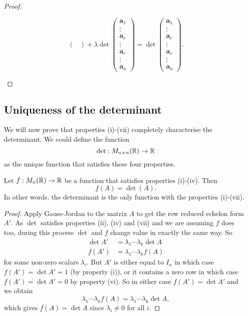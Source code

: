 \documentclass[10pt, a4paper]{article}
\newcommand{\mbf}[1]{\mathbf{#1}}
\begin{document}
\begin{enumerate}[label = (\roman*)]
\begin{proof}
\begin{enumerate}[label = (\roman*)]
\[\begin{pmatrix}
            \end{pmatrix}
            +
            \lambda
            \det\begin{pmatrix}
                \mbf{a}_1 \\ \vdots \\ \mbf{a}_r \\ \vdots \\ \mbf{a}_r \\ \vdots \\ \mbf{a}_n
            \end{pmatrix}
            =
            \det\begin{pmatrix}
                \mbf{a}_1 \\ \vdots \\ \mbf{a}_r \\ \vdots \\ \mbf{a}_s \\ \vdots \\ \mbf{a}_n
            \end{pmatrix}.
            \]
        \end{enumerate}
    \end{proof}
\end{enumerate}

\subsection{Uniqueness of the determinant}
We will now prove that properties (i)-(vii) completely characterise the determinant.
We could define the function
\[
\det : M_{n \times n}(\mathbb{R}) \rightarrow \mathbb{R}
\]
as the unique function that satisfies these four properties.
\begin{theorem}\label{pre_linalg_thm_uniquedet}
    Let $f: M_n(\mathbb{R}) \rightarrow \mathbb{R}$ be a function that satisfies properties (i)-(iv).
    Then
    \[
    f(A) = \det(A).
    \]
    In other words,
    the determinant is the only function with the properties (i)-(vii).
    \begin{proof}
        Apply Gauss-Jordan to the matrix $A$ to get the row reduced echelon form $A'$.
        As $\det$ satisfies properties (ii), (iv) and (vii) and we are assuming $f$ does too,
        during this process $\det$ and $f$ change value in exactly the same way.
        So
        \begin{align*}
            \det A' &= \lambda_1\dotsi\lambda_k\det A \\
            f(A') &= \lambda_1\dotsi\lambda_kf(A)
        \end{align*}
        for some non-zero scalars $\lambda_i$.
        But $A'$ is either equal to $I_n$ in which case $f(A') = \det A' = 1$ (by property (i)),
        or it contains a zero row in which case $f(A') = \det A' = 0$ by property (vi).
        So in either case $f(A') = \det A'$ and we obtain
        \[
        \lambda_1\dotsi\lambda_kf(A) = \lambda_1\dotsi\lambda_k\det A,
        \]
        which gives $f(A) = \det A$ since $\lambda_i \neq 0$ for all $i$.
    \end{proof}
\end{theorem}
\end{document}
